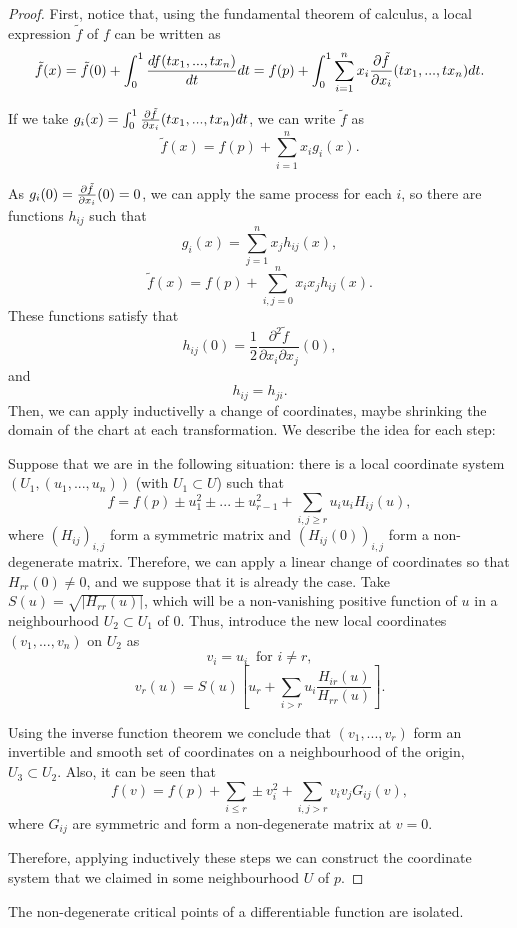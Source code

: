 \begin{proof} First, notice that, using the fundamental theorem of calculus, a local expression $\tilde{f}$ of $f$ can be written as
$$\tilde{f}(x) = \tilde{f}(0) + \int_0^1 \frac{df(tx_1,...,tx_n)}{dt} dt = f(p) + \int_0^1 \sum_{i=1}^n x_i \frac{\partial \tilde{f}}{\partial x_i}(tx_1,...,tx_n) dt .$$

If we take $g_i(x) = \int_0^1 \frac{\partial \tilde{f}}{\partial x_i}(tx_1,...,tx_n) dt$, we can write $\tilde{f}$ as
$$\tilde{f}(x) = f(p) + \sum_{i=1}^n x_i g_i(x) .$$

As $g_i(0) = \frac{\partial \tilde{f}}{\partial x_i}(0) = 0$, we can apply the same process for each $i$, so there are functions $h_{ij}$ such that
$$g_i(x) = \sum_{j=1}^n x_j h_{ij}(x) ,$$
$$\tilde{f}(x) = f(p) + \sum_{i,j=0}^n x_i x_j h_{ij}(x) .$$
These functions satisfy that
$$h_{ij}(0) = \frac12 \frac{\partial^2 \tilde{f}}{\partial x_i \partial x_j}(0) ,$$
and
$$h_{ij} = h_{ji} .$$
Then, we can apply inductivelly a change of coordinates, maybe shrinking the domain of the chart at each transformation. We describe the idea for each step:

Suppose that we are in the following situation: there is a local coordinate system $(U_1, (u_1,...,u_n))$ (with $U_1 \subset U$) such that
$$f = f(p) \pm u_1^2 \pm ... \pm u_{r-1}^2 + \sum_{i,j \geq r} u_i u_i H_{ij}(u) ,$$
where $(H_{ij})_{i,j}$ form a symmetric matrix and $(H_{ij}(0))_{i,j}$ form a non-degenerate matrix. Therefore, we can apply a linear change of coordinates so that $H_{rr}(0) \neq 0$, and we suppose that it is already the case. Take $S(u) = \sqrt{|H_{rr}(u)|}$, which will be a non-vanishing positive function of $u$ in a neighbourhood $U_2 \subset U_1$ of $0$. Thus, introduce the new local coordinates $(v_1,...,v_n)$ on $U_2$ as
$$v_i = u_i \ \text{ for } i \neq r,$$
$$v_r(u) = S(u) \left[ u_r + \sum_{i > r} u_i \frac{H_{ir}(u)}{H_{rr}(u)} \right] .$$

Using the inverse function theorem we conclude that $(v_1,...,v_r)$ form an invertible and smooth set of coordinates on a neighbourhood of the origin, $U_3 \subset U_2$. Also, it can be seen that
$$f(v) = f(p) + \sum_{i \leq r} \pm v_i^2 + \sum_{i,j > r} v_i v_j G_{ij}(v) ,$$
where $G_{ij}$ are symmetric and form a non-degenerate matrix at $v = 0$.

Therefore, applying inductively these steps we can construct the coordinate system that we claimed in some neighbourhood $U$ of $p$.
\end{proof}

\begin{coro}
The non-degenerate critical points of  a differentiable function are isolated.
\end{coro}

